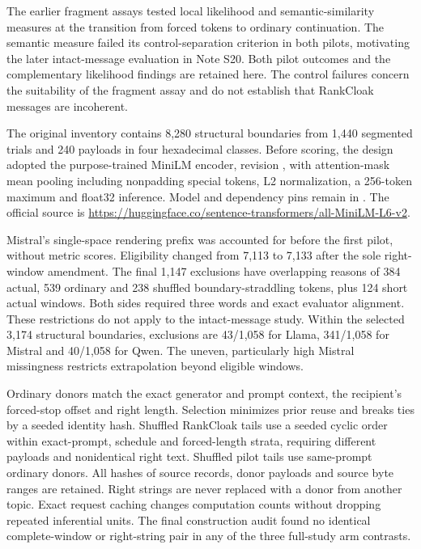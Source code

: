 \label{si:v4-coherence}
The earlier fragment assays tested local likelihood and semantic-similarity measures at the transition from forced tokens to ordinary continuation. The semantic measure failed its control-separation criterion in both pilots, motivating the later intact-message evaluation in Note S20. Both pilot outcomes and the complementary likelihood findings are retained here. The control failures concern the suitability of the fragment assay and do not establish that RankCloak messages are incoherent.

The original inventory contains 8,280 structural boundaries from 1,440 segmented trials and 240 payloads in four hexadecimal classes. Before scoring, the design adopted the purpose-trained MiniLM encoder\cite{Reimers2019SentenceBERT}, revision , with attention-mask mean pooling including nonpadding special tokens, L2 normalization, a 256-token maximum and float32 inference. Model and dependency pins remain in . The official source is \url{https://huggingface.co/sentence-transformers/all-MiniLM-L6-v2}.

Mistral's single-space rendering prefix was accounted for before the first pilot, without metric scores. Eligibility changed from 7,113 to 7,133 after the sole right-window amendment. The final 1,147 exclusions have overlapping reasons of 384 actual, 539 ordinary and 238 shuffled boundary-straddling tokens, plus 124 short actual windows. Both sides required three words and exact evaluator alignment. These restrictions do not apply to the intact-message study. Within the selected 3,174 structural boundaries, exclusions are 43/1,058 for Llama, 341/1,058 for Mistral and 40/1,058 for Qwen. The uneven, particularly high Mistral missingness restricts extrapolation beyond eligible windows.



Ordinary donors match the exact generator and prompt context, the recipient's forced-stop offset and right length. Selection minimizes prior reuse and breaks ties by a seeded identity hash. Shuffled RankCloak tails use a seeded cyclic order within exact-prompt, schedule and forced-length strata, requiring different payloads and nonidentical right text. Shuffled pilot tails use same-prompt ordinary donors. All hashes of source records, donor payloads and source byte ranges are retained. Right strings are never replaced with a donor from another topic. Exact request caching changes computation counts without dropping repeated inferential units. The final construction audit found no identical complete-window or right-string pair in any of the three full-study arm contrasts.

